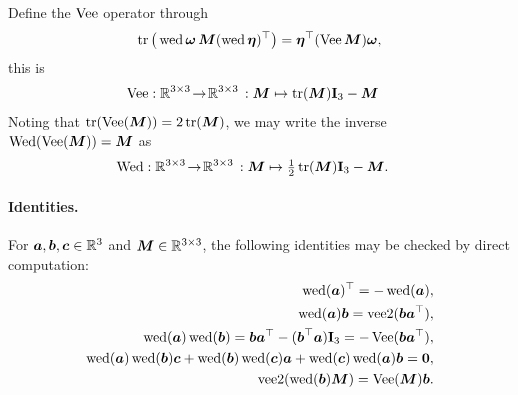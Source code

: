 Define the $\veeMatOp$ operator through
\begin{align}\label{eq:EqVeeMatOpSO3}
 \tr\big( \wedOp\tuple{\omega}\, \mat{M} (\wedOp\tuple{\eta})^\top \big) = \tuple{\eta}^\top (\veeMatOp\mat{M}) \tuple{\omega},
\end{align}
this is
\begin{align}
 \veeMatOp &: \RealNum^{3\times 3} \!\rightarrow\! \RealNum^{3\times3} \, : \mat{M} \mapsto \tr(\mat{M}) \idMat[3] - \mat{M}
\end{align} 
Noting that $\tr(\veeMatOp(\mat{M})) = 2\tr(\mat{M})$, we may write the inverse $\wedMatOp(\veeMatOp(\mat{M})) = \mat{M}$ as
\begin{align}
 \wedMatOp &: \RealNum^{3\times 3} \!\rightarrow\! \RealNum^{3\times3} \, : \mat{M} \mapsto \tfrac{1}{2}\tr(\mat{M}) \idMat[3] - \mat{M}.
\end{align}

\paragraph{Identities.}
For $\tuple{a}, \tuple{b}, \tuple{c} \in \RealNum^{3}$ and $\mat{M}\in\RealNum^{3\times3}$, the following identities may be checked by direct computation:
\begin{subequations}\label{eq:identitiesWedgeSO3}
\begin{align}
 \wedOp(\tuple{a})^\top = -\wedOp(\tuple{a}),
\\
 \wedOp(\tuple{a}) \tuple{b} = \veeTwoOp(\tuple{b} \tuple{a}^\top),
\\
 \wedOp(\tuple{a}) \wedOp(\tuple{b}) = \tuple{b} \tuple{a}^\top - (\tuple{b}^\top \tuple{a}) \idMat[3] = -\veeMatOp(\tuple{b} \tuple{a}^\top),
\\
 \wedOp(\tuple{a}) \wedOp(\tuple{b}) \tuple{c} + \wedOp(\tuple{b}) \wedOp(\tuple{c}) \tuple{a} + \wedOp(\tuple{c}) \wedOp(\tuple{a}) \tuple{b} = \tuple{0},
 \label{eq:JacobiIdentitiySO3}
\\
 \veeTwoOp(\wedOp(\tuple{b}) \mat{M}) = \veeMatOp(\mat{M}) \tuple{b}.
\end{align} 
\end{subequations}

